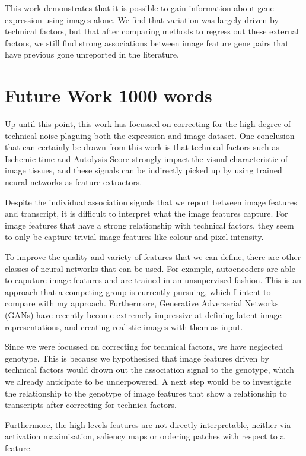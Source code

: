 \documentclass[graybox]{svmult}
\begin{document}
This work demonstrates that it is possible to gain information about gene expression using images alone. We find that variation was largely driven by technical factors, but that after comparing methods to regress out these external factors, we still find strong associations between image feature gene pairs that have previous gone unreported in the literature. 



\section{Future Work 1000 words}

Up until this point, this work has focussed on correcting for the high degree of technical noise plaguing both the expression and image dataset. One conclusion that can certainly be drawn from this work is that technical factors such as Ischemic time and Autolysis Score strongly impact the visual characteristic of image tissues, and these signals can be indirectly picked up by using trained neural networks as feature extractors. 

Despite the individual association signals that we report between image features and transcript, it is difficult to interpret what the image features capture. For image features that have a strong relationship with technical factors, they seem to only be capture trivial image features like colour and pixel intensity.

To improve the quality and variety of features that we can define, there are other classes of neural networks that can be used. For example, autoencoders are able to caputure image features and are trained in an unsupervised fashion. This is an approach that a competing group is currently pursuing, which I intent to compare with my approach. Furthermore, Generative Adverserial Networks (GANs) have recently become extremely impressive at defining latent image representations, and creating realistic images with them as input.

Since we were focussed on correcting for technical factors, we have neglected genotype. This is because we hypothesised that image features driven by technical factors would drown out the association signal to the genotype, which we already anticipate to be underpowered. A next step would be to investigate the relationship to the genotype of image features that show a relationship to transcripts after correcting for technica factors. 

Furthermore, the high levels features are not directly interpretable, neither via activation maximisation, saliency maps or ordering patches with respect to a feature. 
\end{document}
